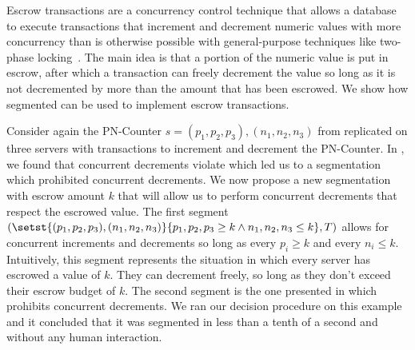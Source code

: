 Escrow transactions are a concurrency control technique that allows a database
to execute transactions that increment and decrement numeric values with more
concurrency than is otherwise possible with general-purpose techniques like
two-phase locking~\cite{o1986escrow}. The main idea is that a portion of the
numeric value is put in escrow, after which a transaction can freely decrement
the value so long as it is not decremented by more than the amount that has
been escrowed. We show how segmented \invariantconfluence{} can be used to
implement escrow transactions.

Consider again the PN-Counter $s = (p_1, p_2, p_3), (n_1, n_2, n_3)$ from
 replicated on three servers with transactions
to increment and decrement the PN-Counter. In
, we found that concurrent decrements violate
\invariantconfluence{} which led us to a segmentation which prohibited concurrent
decrements. We now propose a new segmentation with escrow amount $k$ that will
allow us to perform concurrent decrements that respect the escrowed value. The
first segment $(\setst{(p_1, p_2, p_3), (n_1, n_2, n_3)}{p_1, p_2, p_3 \geq k
\land n_1, n_2, n_3 \leq k}, T)$ allows for concurrent increments and
decrements so long as every $p_i \geq k$ and every $n_i \leq k$. Intuitively,
this segment represents the situation in which every server has escrowed a
value of $k$. They can decrement freely, so long as they don't exceed their
escrow budget of $k$. The second segment is the one presented in
 which prohibits concurrent decrements. We ran
our decision procedure on this example and it concluded that it was segmented
\invariantconfluent{} in less than a tenth of a second and without any human
interaction.

